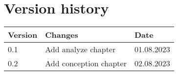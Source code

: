 \chapter{Version history}
\label{chap:report-versions}

\begin{tabular}{|m{}|m{}|m{}|}
 \hline
 \textbf{Version} & \textbf{Changes} & \textbf{Date} \\ [0.5ex]
 \hline
 0.1 & Add analyze chapter & 01.08.2023  \\
 \hline
    0.2 & Add conception chapter & 02.08.2023  \\
    \hline
\end{tabular}